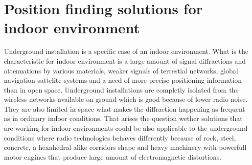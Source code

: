 \documentclass[../main.tex]{subfiles}
\begin{document}
\chapter{Position finding solutions for indoor environment}
\label{chapter:position_finding_solution}

Underground installation is a specific case of an indoor environment. What is the characteristic for indoor environment is a large amount of signal diffractions and attenuations by various materials, weaker signals of terrestial networks, global navigation sattelite systems and a need of more precise positioning information than in open space. Underground installations are completly isolated from the wireless networks available on ground which is good because of lower radio noise. They are also limited in space what makes the diffraction happening as frequent as in ordinary indoor conditions. That arises the question wether solutions that are working for indoor environments could be also applicable to the underground conditions where radio technologies behaves differently because of rock, steel, concrete, a hexahedral\cite{rf_in_mines_straight_gallery}\cite{rf_in_tunnel_waveguide_effect} alike corridors shape and heavy machinery with powerfull motor engines that produce large amount of electromagnetic distortions.
\end{document}
